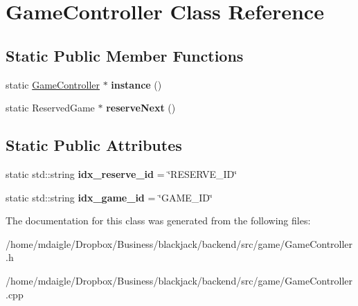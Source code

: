 \hypertarget{classGameController}{
\section{\-Game\-Controller \-Class \-Reference}
\label{classGameController}
}
\subsection*{\-Static \-Public \-Member \-Functions}
\begin{DoxyCompactItemize}
\item 
\hypertarget{classGameController_a15a850a46d900359717e690fd1275e42}{
static \hyperlink{classGameController}{\-Game\-Controller} $\ast$ {\bfseries instance} ()}
\label{classGameController_a15a850a46d900359717e690fd1275e42}

\item 
\hypertarget{classGameController_ac349fe6722ce13b7bdaef953b302fd6c}{
static \-Reserved\-Game $\ast$ {\bfseries reserve\-Next} ()}
\label{classGameController_ac349fe6722ce13b7bdaef953b302fd6c}

\end{DoxyCompactItemize}
\subsection*{\-Static \-Public \-Attributes}
\begin{DoxyCompactItemize}
\item 
\hypertarget{classGameController_a39c21c8677a5ade00387b7b6e1ce7818}{
static std\-::string {\bfseries idx\-\_\-reserve\-\_\-id} = \char`\"{}\-R\-E\-S\-E\-R\-V\-E\-\_\-\-I\-D\char`\"{}}
\label{classGameController_a39c21c8677a5ade00387b7b6e1ce7818}

\item 
\hypertarget{classGameController_a4278bf90461e4dbf4a3f8fb72515710a}{
static std\-::string {\bfseries idx\-\_\-game\-\_\-id} = \char`\"{}\-G\-A\-M\-E\-\_\-\-I\-D\char`\"{}}
\label{classGameController_a4278bf90461e4dbf4a3f8fb72515710a}

\end{DoxyCompactItemize}


\-The documentation for this class was generated from the following files\-:\begin{DoxyCompactItemize}
\item 
/home/mdaigle/\-Dropbox/\-Business/blackjack/backend/src/game/\-Game\-Controller.\-h\item 
/home/mdaigle/\-Dropbox/\-Business/blackjack/backend/src/game/\-Game\-Controller.\-cpp\end{DoxyCompactItemize}
